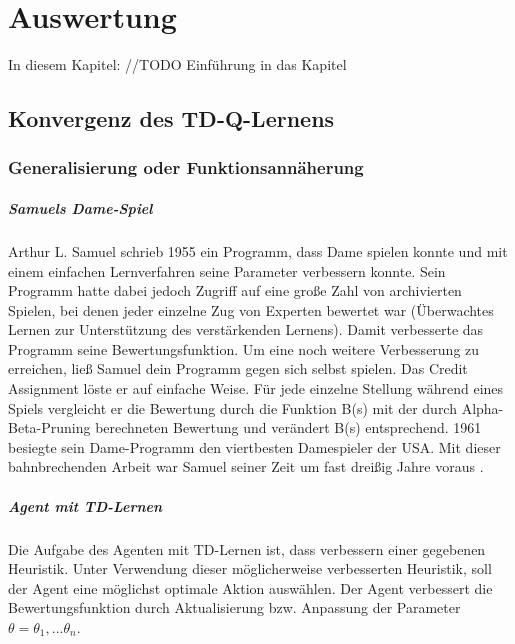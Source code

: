 \chapter{Auswertung}
\label{cha:auswertung}

In diesem Kapitel: //TODO Einführung in das Kapitel

\section{Konvergenz des TD-Q-Lernens}

\subsection{Generalisierung oder Funktionsannäherung}
\label{subsec:Generalisierung oder Funktionsannäherung}

\paragraph{Samuels Dame-Spiel}
Arthur L. Samuel schrieb 1955 ein Programm, dass Dame spielen konnte und mit einem einfachen Lernverfahren seine Parameter verbessern konnte. Sein Programm hatte dabei jedoch Zugriff auf eine große Zahl von archivierten Spielen, bei denen jeder einzelne Zug von Experten bewertet war (Überwachtes Lernen zur Unterstützung des verstärkenden Lernens). Damit verbesserte das Programm seine Bewertungsfunktion. Um eine noch weitere Verbesserung zu erreichen, ließ Samuel dein Programm gegen sich selbst spielen. Das Credit Assignment löste er auf einfache Weise. Für jede einzelne Stellung während eines Spiels vergleicht er die Bewertung durch die Funktion B(s) mit der durch Alpha-Beta-Pruning berechneten Bewertung und verändert B(s) entsprechend. 1961 besiegte sein Dame-Programm den viertbesten Damespieler der USA. Mit dieser bahnbrechenden Arbeit war Samuel seiner Zeit um fast dreißig Jahre voraus \cite[120\psq]{Ertel}.

\paragraph{Agent mit TD-Lernen}
Die Aufgabe des Agenten mit TD-Lernen ist, dass verbessern einer gegebenen Heuristik. Unter Verwendung dieser möglicherweise verbesserten Heuristik, soll der Agent eine möglichst optimale Aktion auswählen. Der Agent verbessert die Bewertungsfunktion durch Aktualisierung bzw. Anpassung der Parameter $\theta = \theta_1, ... \theta_n$. 

